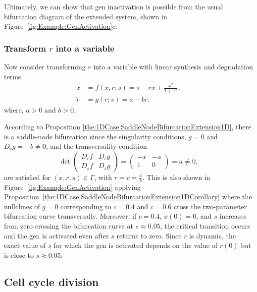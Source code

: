 \documentclass[12pt]{article}
\begin{document}
Ultimately, we can show that gen inactivation is possible from the usual bifurcation diagram of the extended system, shown in Figure~\ref{fig:Example:GenActivation}c. 


\subsubsection{Transform $r$ into a variable}

Now consider transforming $r$ into a variable with linear synthesis and degradation terms
\begin{equation}
    \begin{aligned}
        \dot x & = f(x,r;s) = s - rx + \frac{x^{2}}{1+x^{2}}, \\
        \dot r & = g(r;s) = a - br.
    \end{aligned}
    \label{equ:Example:GenActivation1:2D}
\end{equation}
where, $a>0$ and $b>0$.

According to Proposition \ref{the:1DCase:SaddleNodeBifurcationExtension1D}, there is a saddle-node bifurcation since the singularity conditions, $g=0$ and $D_{r}g=-b\neq 0$, and the transversality condition
\[\det\begin{pmatrix}
            D_{r}f & D_{r}g \\
            D_{s}f & D_{s}g
        \end{pmatrix} = 
        \begin{pmatrix}
            -x & -a\\
            1 & 0
        \end{pmatrix} = a \neq 0,\]
are satisfied for $(x,r,s)\in \Gamma$, with $r=c=\frac{a}{b}$. This is also shown in Figure~\ref{fig:Example:GenActivation} applying Proposition~\ref{the:1DCase:SaddleNodeBifurcationExtension1DCorollary} where the nullclines of $g=0$ corresponding to $c=0.4$ and $c=0.6$ cross the two-parameter bifurcation curve transversally. Moreover, if $c=0.4$, $x(0)=0$, and $s$ increases from zero crossing the bifurcation curve at $s\approx0.05$, the critical transition occurs and the gen is activated even after $s$ returns to zero. Since $r$ is dynamic, the exact value of $s$ for which the gen is activated depends on the value of $r(0)$ but is close to $s\approx0.05$. 

\subsection{Cell cycle division}
\end{document}
